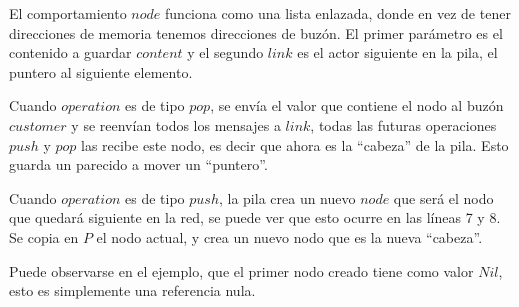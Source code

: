 El comportamiento $node$ funciona como una lista enlazada, donde en vez de tener direcciones de memoria tenemos direcciones de buzón. El primer parámetro es el contenido a guardar $content$ y el segundo $link$ es el actor siguiente en la pila, el puntero al siguiente elemento.

Cuando $operation$ es de tipo $pop$, se envía el valor que contiene el nodo al buzón $customer$ y se reenvían todos los mensajes a $link$, todas las futuras operaciones $push$ y $pop$ las recibe este nodo, es decir que ahora es la ``cabeza'' de la pila. Esto guarda un parecido a mover un ``puntero''.

Cuando $operation$ es de tipo $push$, la pila crea un nuevo $node$ que será el nodo que quedará siguiente en la red, se puede ver que esto ocurre en las líneas 7 y 8. Se copia en $P$ el nodo actual, y crea un nuevo nodo que es la nueva ``cabeza''.

Puede observarse en el ejemplo, que el primer nodo creado tiene como valor $Nil$, esto es simplemente una referencia nula. 

